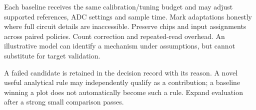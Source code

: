 Each baseline receives the same calibration/tuning budget and may adjust supported
references, ADC settings and sample time. Mark adaptations honestly where full circuit
details are inaccessible. Preserve chips and input assignments across paired policies.
Count correction and repeated-read overhead. An illustrative model can identify a
mechanism under assumptions, but cannot substitute for target validation.

A failed candidate is retained in the decision record with its reason. A novel useful
analytical rule may independently qualify as a contribution; a baseline winning a plot
does not automatically become such a rule. Expand evaluation after a strong small
comparison passes.
